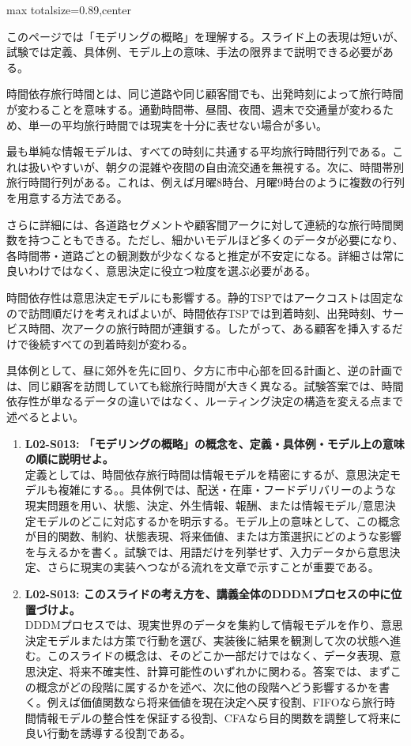 \begin{minipage}[t]{0.58\textwidth}
\begin{adjustbox}{max totalsize={\textwidth}{0.89\textheight},center}
\begin{minipage}{\textwidth}\scriptsize
{}このページでは「モデリングの概略」を理解する。スライド上の表現は短いが、試験では定義、具体例、モデル上の意味、手法の限界まで説明できる必要がある。\par
時間依存旅行時間とは、同じ道路や同じ顧客間でも、出発時刻によって旅行時間が変わることを意味する。通勤時間帯、昼間、夜間、週末で交通量が変わるため、単一の平均旅行時間では現実を十分に表せない場合が多い。\par
最も単純な情報モデルは、すべての時刻に共通する平均旅行時間行列である。これは扱いやすいが、朝夕の混雑や夜間の自由流交通を無視する。次に、時間帯別旅行時間行列がある。これは、例えば月曜8時台、月曜9時台のように複数の行列を用意する方法である。\par
さらに詳細には、各道路セグメントや顧客間アークに対して連続的な旅行時間関数を持つこともできる。ただし、細かいモデルほど多くのデータが必要になり、各時間帯・道路ごとの観測数が少なくなると推定が不安定になる。詳細さは常に良いわけではなく、意思決定に役立つ粒度を選ぶ必要がある。\par
時間依存性は意思決定モデルにも影響する。静的TSPではアークコストは固定なので訪問順だけを考えればよいが、時間依存TSPでは到着時刻、出発時刻、サービス時間、次アークの旅行時間が連鎖する。したがって、ある顧客を挿入するだけで後続すべての到着時刻が変わる。\par
具体例として、昼に郊外を先に回り、夕方に市中心部を回る計画と、逆の計画では、同じ顧客を訪問していても総旅行時間が大きく異なる。試験答案では、時間依存性が単なるデータの違いではなく、ルーティング決定の構造を変える点まで述べるとよい。\par{}\begin{enumerate}\item \textbf{L02-S013: 「モデリングの概略」の概念を、定義・具体例・モデル上の意味の順に説明せよ。}\\定義としては、時間依存旅行時間は情報モデルを精密にするが、意思決定モデルも複雑にする。。具体例では、配送・在庫・フードデリバリーのような現実問題を用い、状態、決定、外生情報、報酬、または情報モデル/意思決定モデルのどこに対応するかを明示する。モデル上の意味として、この概念が目的関数、制約、状態表現、将来価値、または方策選択にどのような影響を与えるかを書く。試験では、用語だけを列挙せず、入力データから意思決定、さらに現実の実装へつながる流れを文章で示すことが重要である。\item \textbf{L02-S013: このスライドの考え方を、講義全体のDDDMプロセスの中に位置づけよ。}\\DDDMプロセスでは、現実世界のデータを集約して情報モデルを作り、意思決定モデルまたは方策で行動を選び、実装後に結果を観測して次の状態へ進む。このスライドの概念は、そのどこか一部だけではなく、データ表現、意思決定、将来不確実性、計算可能性のいずれかに関わる。答案では、まずこの概念がどの段階に属するかを述べ、次に他の段階へどう影響するかを書く。例えば価値関数なら将来価値を現在決定へ戻す役割、FIFOなら旅行時間情報モデルの整合性を保証する役割、CFAなら目的関数を調整して将来に良い行動を誘導する役割である。\end{enumerate}

\end{minipage}
\end{adjustbox}
\end{minipage}
